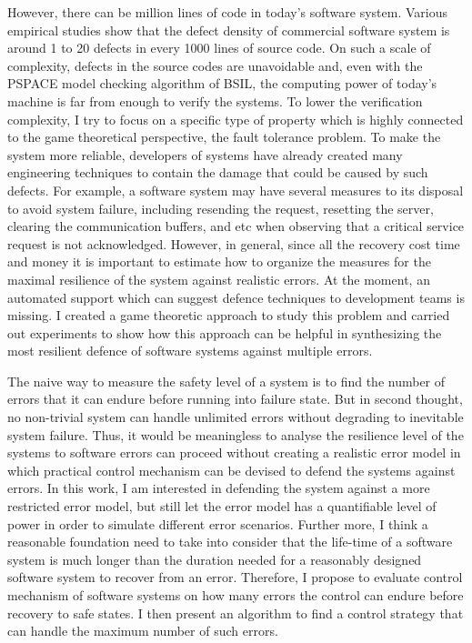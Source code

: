 However, there can be million lines of code in today's software system.
Various empirical studies show that the defect density of commercial software system is around 1 to 20 defects in every 1000 lines of source code\cite{Sommerville:2006:SE:1196763}.
On such a scale of complexity, defects in the source codes are unavoidable and, even with the PSPACE model checking algorithm of BSIL, the computing power of today's machine is far from enough to verify the systems.   
To lower the verification complexity, I try to focus on a specific type of property which is highly connected to the game theoretical perspective, the fault tolerance problem.
To make the system more reliable, developers of systems have already created many engineering techniques to contain the damage that could be caused by such defects.
For example, a software system may have several measures to its disposal to avoid system failure, including resending the request, resetting the server, clearing the communication buffers, and etc when observing that a critical service request is not acknowledged.
However, in general, since all the recovery cost time and money it is important to estimate how to organize the measures for the maximal resilience of the system against realistic errors.
At the moment, an automated support which can suggest defence techniques to development teams is missing.
I created a game theoretic approach to study this problem and carried out experiments to show how this approach can be helpful in  synthesizing the most resilient defence of software systems against multiple errors.

The naive way to measure the safety level of a system is to find the number of errors that it can endure before running into failure state.
But in second thought, no non-trivial system can handle unlimited errors without degrading to inevitable system failure.
Thus, it would be meaningless to analyse the resilience level of the systems to software errors can proceed without creating a realistic error model in which practical control mechanism can be devised to defend the systems against errors.
In this work, I am interested in defending the system against a more restricted error model, but still let the error model has a quantifiable level of power in order to simulate different error scenarios.
Further more, I think a reasonable foundation need to take into consider that the life-time of a software system is much longer than the duration needed for a reasonably designed software system to recover from an error.
Therefore, I propose to evaluate control mechanism of software systems on how many errors the control can endure before recovery to safe states.
I then present an algorithm to find a control strategy that can handle the maximum number of such errors.

